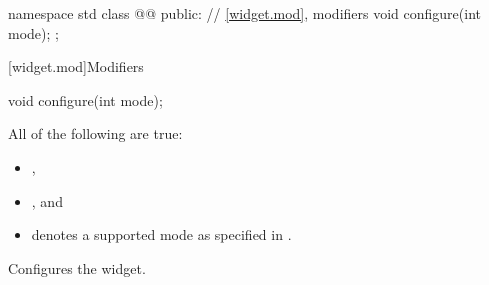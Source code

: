 \begin{codeblock}
namespace std {
  class @@ {
  public:
    // \ref{widget.mod}, modifiers
    void configure(int mode);
  };
}
\end{codeblock}

[widget.mod]{Modifiers}

%
\begin{itemdecl}
void configure(int mode);
\end{itemdecl}

\begin{itemdescr}
\pnum
\constraints
All of the following are true:
\begin{itemize}
\item {},
\item {}, and
\item {} denotes a supported mode as specified in .
\end{itemize}

\pnum
\effects
Configures the widget.
\end{itemdescr}

